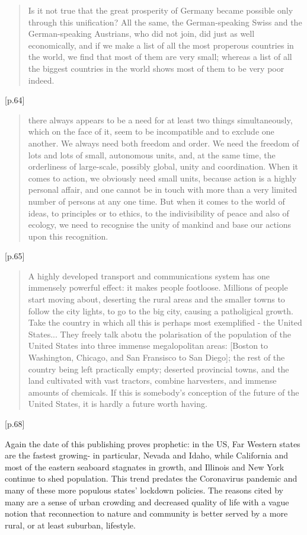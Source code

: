 \documentclass[10pt,letterpaper,openany]{book}
\begin{document}
\begin{quote}
Is it not true that the great prosperity of Germany became possible only through this unification? All the same, the German-speaking Swiss and the German-speaking Austrians, who did not join, did just as well economically, and if we make a list of all the most properous countries in the world, we find that most of them are very small; whereas a list of all the biggest countries in the world shows most of them to be very poor indeed.
\end{quote} [p.64]

\begin{quote}
there always appears to be a need for at least two things simultaneously, which on the face of it, seem to be incompatible and to exclude one another. We always need both freedom and order. We need the freedom of lots and lots of small, autonomous units, and, at the same time, the orderliness of large-scale, possibly global, unity and coordination. When it comes to action, we obviously need small units, because action is a highly personal affair, and one cannot be in touch with more than a very limited number of persons at any one time. But when it comes to the world of ideas, to principles or to ethics, to the indivisibility of peace and also of ecology, we need to recognise the unity of mankind and base our actions upon this recognition.
\end{quote} [p.65]

\begin{quote}
A highly developed transport and communications system has one immensely powerful effect: it makes people footloose. Millions of people start moving about, deserting the rural areas and the smaller towns to follow the city lights, to go to the big city, causing a patholigical growth. Take the country in which all this is perhaps most exemplified - the United States... They freely talk abotu the polarisation of the population of the United States into three immense megalopolitan areas: [Boston to Washington, Chicago, and San Fransisco to San Diego]; the rest of the country being left practically empty; deserted provincial towns, and the land cultivated with vast tractors, combine harvesters, and immense amounts of chemicals. If this is somebody's conception of the future of the United States, it is hardly a future worth having.
\end{quote}[p.68]

Again the date of this publishing proves prophetic: in the US, Far Western states are the fastest growing- in particular, Nevada and Idaho, while California and most of the eastern seaboard stagnates in growth, and Illinois and New York continue to shed population. This trend predates the Coronavirus pandemic and many of these more populous states' lockdown policies. The reasons cited by many are a sense of urban crowding and decreased quality of life with a vague notion that reconnection to nature and community is better served by a more rural, or at least suburban, lifestyle.
\end{document}
